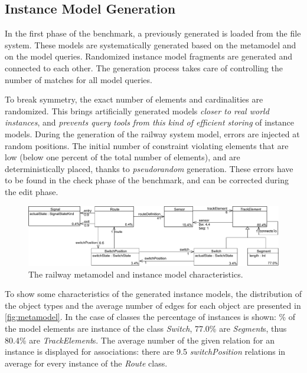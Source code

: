 \subsection{Instance Model Generation}
\label{sec:instanceGeneration}

In the first phase of the benchmark, a previously generated  is loaded from the file system. These models are systematically generated based on the metamodel and on the model queries. Randomized instance model fragments are generated and connected to each other. The generation process takes care of controlling the number of matches for all model queries.

To break symmetry, the exact number of elements and cardinalities are randomized. This brings artificially generated models \emph{closer to real world instances}, and \emph{prevents query tools from this kind of efficient storing} of instance models. During the generation of the railway system model, errors are injected at random positions. The initial number of constraint violating elements that are low (below one percent of the total number of elements), and are deterministically placed, thanks to \emph{pseudorandom} generation. These errors have to be found in the check phase of the benchmark, and can be corrected during the edit phase.

\begin{figure}[htb]
\begin{center}
\includegraphics[width=\textwidth]{figures/instance/TrainMMb.pdf}
\caption{The railway metamodel and instance model characteristics.}
\label{fig:metamodel-instance-characteristics}
\end{center}
\end{figure}

To show some characteristics of the generated instance models, the distribution of the object types and the average number of edges for each object are presented in \autoref{fig:metamodel}. In the case of classes the percentage of instances is shown: \% of the model elements are instance of the class \emph{Switch}, 77.0\% are \emph{Segment}s, thus 80.4\% are \emph{TrackElement}s. The average number of the given relation for an instance is displayed for associations: \eg there are 9.5 \emph{switchPosition} relations in average for every instance of the \emph{Route} class.
